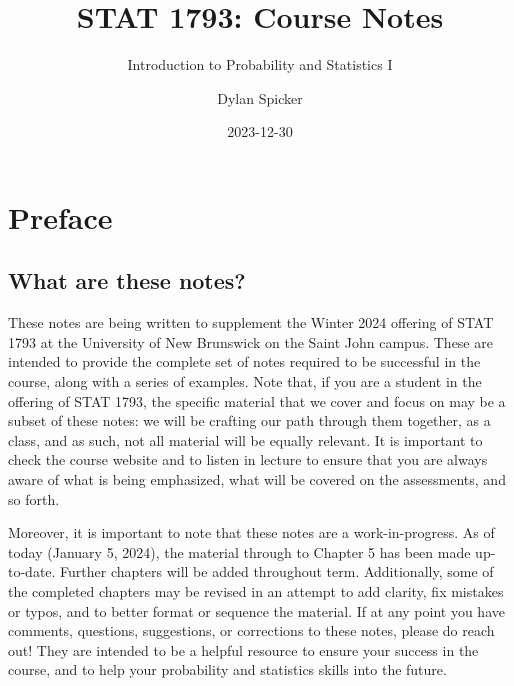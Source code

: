 \documentclass[
  letterpaper,
  DIV=11,
  numbers=noendperiod]{scrreprt}
\title{STAT 1793: Course Notes}
\subtitle{Introduction to Probability and Statistics I}
\author{Dylan Spicker}
\date{2023-12-30}
\renewcommand*\contentsname{Table of contents}
\newcommand\contentsname{Table of contents}
\theoremstyle{definition}
\theoremstyle{definition}
\theoremstyle{definition}
\theoremstyle{remark}
\begin{document}
\maketitle

\renewcommand*\contentsname{Table of contents}
{
\hypersetup{linkcolor=}
\setcounter{tocdepth}{2}
\tableofcontents
}

\chapter*{Preface}\label{preface}


\section*{What are these notes?}\label{what-are-these-notes}


These notes are being written to supplement the Winter 2024 offering of
STAT 1793 at the University of New Brunswick on the Saint John campus.
These are intended to provide the complete set of notes required to be
successful in the course, along with a series of examples. Note that, if
you are a student in the offering of STAT 1793, the specific material
that we cover and focus on may be a subset of these notes: we will be
crafting our path through them together, as a class, and as such, not
all material will be equally relevant. It is important to check the
course website and to listen in lecture to ensure that you are always
aware of what is being emphasized, what will be covered on the
assessments, and so forth.

Moreover, it is important to note that these notes are a
work-in-progress. As of today (January 5, 2024), the material through to
Chapter 5 has been made up-to-date. Further chapters will be added
throughout term. Additionally, some of the completed chapters may be
revised in an attempt to add clarity, fix mistakes or typos, and to
better format or sequence the material. If at any point you have
comments, questions, suggestions, or corrections to these notes, please
do reach out! They are intended to be a helpful resource to ensure your
success in the course, and to help your probability and statistics
skills into the future.
\end{document}
